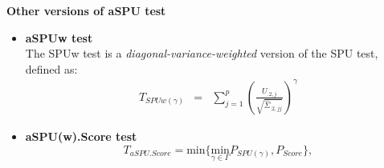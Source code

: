 \documentclass[compress]{beamer}
\begin{document}
\begin{frame}[allowframebreaks]
\framebreak
\textbf{Other versions of aSPU test}
\begin{itemize}
\item \textbf{aSPUw test}\\
The SPUw test is a \textit{diagonal-variance-weighted} version of the SPU test, defined as:
\begin{eqnarray*}
T_{SPUw(\gamma)} & = & \sum_{j=1}^{p}\left(\frac{U_{.2,j}}{\sqrt{\hat{\Sigma}_{.2,jj}}}\right)^{\gamma}
\end{eqnarray*}

\item \textbf{aSPU(w).Score test }\\
$$
T_{aSPU.Score} = \textrm{min} \Big\{ \underset{\gamma\in\Gamma}{ \textrm{min} } P_{ SPU(\gamma) }, P_{Score} \Big\},
$$ 
\end{itemize}
\end{frame}



\end{document}
